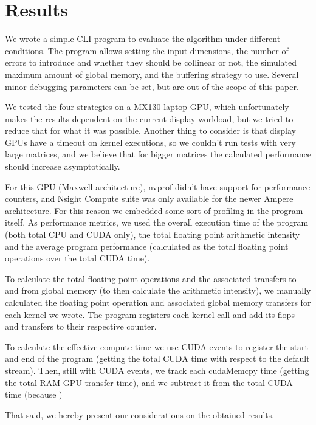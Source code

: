 \section{Results}
\label{sec:results}

We wrote a simple CLI program to evaluate the algorithm under different conditions.
The program allows setting the input dimensions, the number of errors to introduce
and whether they should be collinear or not,
the simulated maximum amount of global memory, and the buffering strategy to use.
Several minor debugging parameters can be set, but are out of the scope of this paper.

We tested the four strategies on a MX130 laptop GPU, which unfortunately makes the results dependent on the current display workload, but we tried to reduce that for what it was possible.
Another thing to consider is that display GPUs have a timeout on kernel executions, so we couldn't run tests with very large matrices, and we believe that for bigger matrices the calculated performance should increase asymptotically.

For this GPU (Maxwell architecture), nvprof didn't have support for performance counters, and Nsight Compute suite was only available for the newer Ampere architecture.
For this reason we embedded some sort of profiling in the program itself.
As performance metrics, we used the overall execution time of the program (both total CPU and CUDA only), the total floating point arithmetic intensity and the average program performance (calculated as the total floating point operations over the total CUDA time).

To calculate the total floating point operations and the associated transfers to and from global memory (to then calculate the arithmetic intensity), we manually calculated the floating point operation and associated global memory transfers for each kernel we wrote. The program registers each kernel call and add its flops and transfers to their respective counter.

To calculate the effective compute time we use CUDA events to register the start and end of the program (getting the total CUDA time with respect to the default stream).
Then, still with CUDA events, we track each cudaMemcpy time (getting the total RAM-GPU transfer time), and we subtract it from the total CUDA time (because )

That said, we hereby present our considerations on the obtained results.
